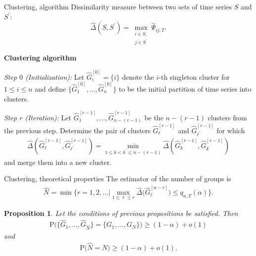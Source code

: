 \documentclass[10pt]{beamer}
\newcommand{\Prob}{\mathrm{P}}
\newtheorem{prop}{Proposition}
\begin{document}
\begin{frame}{Clustering, algorithm}
Dissimilarity measure between two sets of time series $S$ and $S^{\prime}$:
\begin{equation*}\label{dissimilarity}
\widehat{\Delta}(S,S^\prime) = \max_{\substack{i \in S, \\ j \in S^\prime}} \widehat{\Psi}_{ij,T}. 
\end{equation*}
\begin{center}
\textbf{Clustering algorithm}
\end{center}

\textit{Step $0$ (Initialization):} Let $\widehat{G}_i^{[0]} = \{ i \}$ denote the $i$-th singleton cluster for $1 \le i \le n$ and define $\{\widehat{G}_1^{[0]},\ldots,\widehat{G}_n^{[0]} \}$ to be the initial partition of time series into clusters. 

\noindent \textit{Step $r$ (Iteration):} Let $\widehat{G}_1^{[r-1]},\ldots,\widehat{G}_{n-(r-1)}^{[r-1]}$ be the $n-(r-1)$ clusters from the previous step. Determine the pair of clusters $\widehat{G}_{\ell}^{[r-1]}$ and $\widehat{G}_{{\ell}^\prime}^{[r-1]}$ for which 
\begin{align*}
\widehat{\Delta}(\widehat{G}_{\ell}^{[r-1]},\widehat{G}_{{\ell}^\prime}^{[r-1]}) = \min_{1 \le k < k^\prime \le n-(r-1)} \widehat{\Delta}(\widehat{G}_{k}^{[r-1]},\widehat{G}_{k^\prime}^{[r-1]})
\end{align*}
and merge them into a new cluster. 
\end{frame}

\begin{frame}{Clustering, theoretical properties}
The estimator of the number of groups is
\begin{align*}
\widehat{N} = \min \Big\{ r = 1,2,\ldots \Big| \max_{1 \le \ell \le r} \widehat{\Delta} \big( \widehat{G}_\ell^{[n-r]} \big) \le q_{n,T}(\alpha) \Big\}.
\end{align*}\pause
\begin{prop}\label{prop-clustering-1}
Let the conditions of previous propositions be satisfied. Then 
\begin{align*}
\Prob \Big( \big\{ \widehat{G}_1,\ldots,\widehat{G}_{\widehat{N}} \big\} = \{ G_1,\ldots,G_N \} \Big) \ge (1-\alpha) + o(1)
\end{align*}
and 
\begin{align*}
\Prob \big( \widehat{N} = N \big) \ge (1-\alpha) + o(1).
\end{align*}
\end{prop}
\end{frame}
\end{document}

